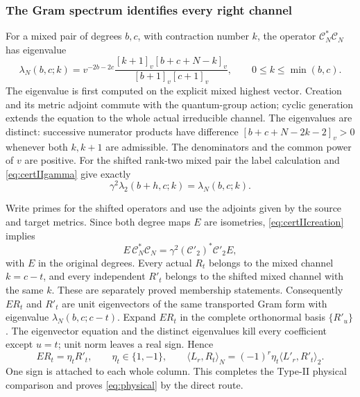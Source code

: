 \documentclass[10pt,a4paper]{article}
\newenvironment{revision}{\begingroup}{\endgroup}
\begin{document}
\begin{revision}
\subsubsection*{The Gram spectrum identifies every right channel}
For a mixed pair of degrees $b,c$, with contraction number $k$, the operator
$\mathcal C_N^*\mathcal C_N$ has eigenvalue
\begin{equation}\label{eq:certIIspectrum}
 \lambda_N(b,c;k)=v^{-2b-2c}
   \frac{[k+1]_v[b+c+N-k]_v}{[b+1]_v[c+1]_v},
 \qquad 0\le k\le\min(b,c).
\end{equation}
The eigenvalue is first computed on the explicit mixed highest vector.
Creation and its metric adjoint commute with the quantum-group action;
cyclic generation extends the equation to the whole actual irreducible
channel. The eigenvalues are distinct: successive numerator products have
difference $[b+c+N-2k-2]_v>0$ whenever both $k,k+1$ are admissible.
The denominators and the common power of $v$ are positive.
For the shifted rank-two mixed pair the label calculation and
\eqref{eq:certIIgamma} give exactly
\begin{equation}\label{eq:certIIspectralmatch}
 \gamma^2\lambda_2(b+h,c;k)=\lambda_N(b,c;k).
\end{equation}

Write primes for the shifted operators and use the adjoints given by the
source and target metrics. Since both degree maps $E$ are isometries,
\eqref{eq:certIIcreation} implies
\[
 E\,\mathcal C_N^*\mathcal C_N
   =\gamma^2(\mathcal C'_2)^*\mathcal C'_2 E,
\]
with $E$ in the original degrees. Every actual $R_t$ belongs to the mixed channel
$k=c-t$, and every independent $R'_t$ belongs to the shifted mixed channel
with the same $k$. These are separately proved membership statements.
Consequently $E R_t$ and $R'_t$ are unit eigenvectors of the same
transported Gram form with eigenvalue $\lambda_N(b,c;c-t)$.
Expand $E R_t$ in the complete orthonormal basis $\{R'_u\}$.
The eigenvector equation and the distinct eigenvalues kill every
coefficient except $u=t$; unit norm leaves a real sign. Hence
\begin{equation}\label{eq:certIIright}
 E R_t=\eta_tR'_t,\qquad\eta_t\in\{1,-1\},
 \qquad
 \langle L_r,R_t\rangle_N
    =(-1)^r\eta_t\langle L'_r,R'_t\rangle_2.
\end{equation}
One sign is attached to each whole column. This completes the Type-II
physical comparison and proves \eqref{eq:physical} by the direct route.


\end{revision}
\end{document}

